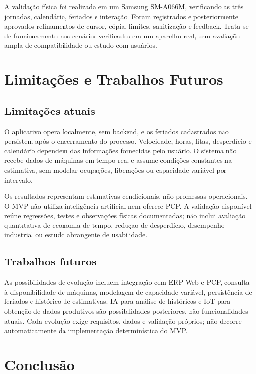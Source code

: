 \documentclass[12pt]{article}
\begin{document}
A validação física foi realizada em um Samsung SM-A066M, verificando as três jornadas, calendário, feriados e interação. Foram registrados e posteriormente aprovados refinamentos de cursor, cópia, limites, sanitização e feedback. Trata-se de funcionamento nos cenários verificados em um aparelho real, sem avaliação ampla de compatibilidade ou estudo com usuários.

\section{Limitações e Trabalhos Futuros}\label{limitauxe7uxf5es-e-trabalhos-futuros}

\subsection{Limitações atuais}\label{limitauxe7uxf5es-atuais}

O aplicativo opera localmente, sem backend, e os feriados cadastrados não persistem após o encerramento do processo. Velocidade, horas, fitas, desperdício e calendário dependem das informações fornecidas pelo usuário. O sistema não recebe dados de máquinas em tempo real e assume condições constantes na estimativa, sem modelar ocupações, liberações ou capacidade variável por intervalo.

Os resultados representam estimativas condicionais, não promessas operacionais. O MVP não utiliza inteligência artificial nem oferece PCP. A validação disponível reúne regressões, testes e observações físicas documentadas; não inclui avaliação quantitativa de economia de tempo, redução de desperdício, desempenho industrial ou estudo abrangente de usabilidade.

\subsection{Trabalhos futuros}\label{trabalhos-futuros}

As possibilidades de evolução incluem integração com ERP Web e PCP, consulta à disponibilidade de máquinas, modelagem de capacidade variável, persistência de feriados e histórico de estimativas. IA para análise de históricos e IoT para obtenção de dados produtivos são possibilidades posteriores, não funcionalidades atuais. Cada evolução exige requisitos, dados e validação próprios; não decorre automaticamente da implementação determinística do MVP.

\section{Conclusão}\label{conclusuxe3o}
\end{document}
